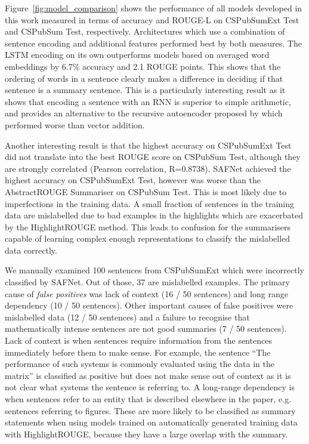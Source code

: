 \documentclass[11pt,a4paper]{article}
\begin{document}
Figure~\ref{fig:model_comparison} shows the performance of all models developed in this work measured in terms of accuracy and ROUGE-L on CSPubSumExt Test and CSPubSum Test, respectively. Architectures which use a combination of sentence encoding and additional features performed best by both measures. The LSTM encoding on its own outperforms models based on averaged word embeddings by 6.7\% accuracy and 2.1 ROUGE points. This shows that the ordering of words in a sentence clearly makes a difference in deciding if that sentence is a summary sentence. This is a particularly interesting result as it shows that encoding a sentence with an RNN is superior to simple arithmetic, and provides an alternative to the recursive autoencoder proposed by  \cite{recursiveaeSocher2011} which performed worse than vector addition.

Another interesting result is that the highest accuracy on CSPubSumExt Test did not translate into the best ROUGE score on CSPubSum Test, although they are strongly correlated (Pearson correlation, R=$0.8738$). SAFNet achieved the highest accuracy on CSPubSumExt Test, however was worse than the AbstractROUGE Summariser on CSPubSum Test. This is most likely due to imperfections in the training data. A small fraction of sentences in the training data are mislabelled due to bad examples in the highlights which are exacerbated by the HighlightROUGE method. This leads to confusion for the summarisers capable of learning complex enough representations to classify the mislabelled data correctly. 

We manually examined 100 sentences from CSPubSumExt which were incorrectly classified by SAFNet. Out of those, 37 are mislabelled examples.
The primary cause of \textit{false positives} was lack of context (16 / 50 sentences) and long range dependency (10 / 50 sentences). Other important causes of false positives were mislabelled data (12 / 50 sentences) and a failure to recognise that mathematically intense sentences are not good summaries (7 / 50 sentences). Lack of context is when sentences require information from the sentences immediately before them to make sense. For example, the sentence ``The performance of such systems is commonly evaluated using the data in the matrix'' is classified as positive but does not make sense out of context as it is not clear what systems the sentence is referring to. %
A long-range dependency is when sentences refer to an entity that is described elsewhere in the paper, e.g. sentences referring to figures. %
These are more likely to be classified as summary statements when using models trained on automatically generated training data with HighlightROUGE, because they have a large overlap with the summary.%
\end{document}
